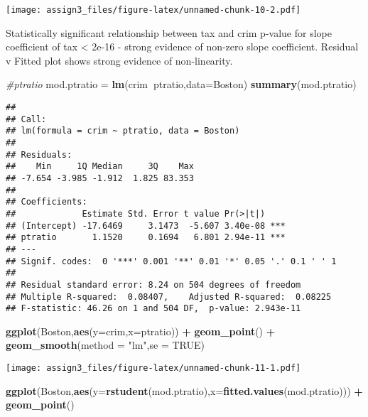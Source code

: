 \documentclass[]{article}
\newenvironment{Shaded}{\begin{snugshade}}{\end{snugshade}}
\newcommand{\CommentTok}[1]{\textcolor[rgb]{0.56,0.35,0.01}{\textit{#1}}}
\newcommand{\DataTypeTok}[1]{\textcolor[rgb]{0.13,0.29,0.53}{#1}}
\newcommand{\KeywordTok}[1]{\textcolor[rgb]{0.13,0.29,0.53}{\textbf{#1}}}
\newcommand{\NormalTok}[1]{#1}
\newcommand{\OperatorTok}[1]{\textcolor[rgb]{0.81,0.36,0.00}{\textbf{#1}}}
\newcommand{\OtherTok}[1]{\textcolor[rgb]{0.56,0.35,0.01}{#1}}
\newcommand{\StringTok}[1]{\textcolor[rgb]{0.31,0.60,0.02}{#1}}
\begin{document}
\texttt{[image: assign3\_files/figure-latex/unnamed-chunk-10-2.pdf]}

Statistically significant relationship between tax and crim p-value for
slope coefficient of tax \textless{} 2e-16 - strong evidence of non-zero
slope coefficient. Residual v Fitted plot shows strong evidence of
non-linearity.

\begin{Shaded}
\begin{Highlighting}[]
\CommentTok{#ptratio}
\NormalTok{mod.ptratio =}\StringTok{ }\KeywordTok{lm}\NormalTok{(crim}\OperatorTok{~}\NormalTok{ptratio,}\DataTypeTok{data=}\NormalTok{Boston)}
\KeywordTok{summary}\NormalTok{(mod.ptratio)}
\end{Highlighting}
\end{Shaded}

\begin{verbatim}
## 
## Call:
## lm(formula = crim ~ ptratio, data = Boston)
## 
## Residuals:
##    Min     1Q Median     3Q    Max 
## -7.654 -3.985 -1.912  1.825 83.353 
## 
## Coefficients:
##             Estimate Std. Error t value Pr(>|t|)    
## (Intercept) -17.6469     3.1473  -5.607 3.40e-08 ***
## ptratio       1.1520     0.1694   6.801 2.94e-11 ***
## ---
## Signif. codes:  0 '***' 0.001 '**' 0.01 '*' 0.05 '.' 0.1 ' ' 1
## 
## Residual standard error: 8.24 on 504 degrees of freedom
## Multiple R-squared:  0.08407,    Adjusted R-squared:  0.08225 
## F-statistic: 46.26 on 1 and 504 DF,  p-value: 2.943e-11
\end{verbatim}

\begin{Shaded}
\begin{Highlighting}[]
\KeywordTok{ggplot}\NormalTok{(Boston,}\KeywordTok{aes}\NormalTok{(}\DataTypeTok{y=}\NormalTok{crim,}\DataTypeTok{x=}\NormalTok{ptratio)) }\OperatorTok{+}\StringTok{ }\KeywordTok{geom_point}\NormalTok{() }\OperatorTok{+}\StringTok{ }\KeywordTok{geom_smooth}\NormalTok{(}\DataTypeTok{method =} \StringTok{"lm"}\NormalTok{,}\DataTypeTok{se =} \OtherTok{TRUE}\NormalTok{)}
\end{Highlighting}
\end{Shaded}

\texttt{[image: assign3\_files/figure-latex/unnamed-chunk-11-1.pdf]}

\begin{Shaded}
\begin{Highlighting}[]
\KeywordTok{ggplot}\NormalTok{(Boston,}\KeywordTok{aes}\NormalTok{(}\DataTypeTok{y=}\KeywordTok{rstudent}\NormalTok{(mod.ptratio),}\DataTypeTok{x=}\KeywordTok{fitted.values}\NormalTok{(mod.ptratio))) }\OperatorTok{+}\StringTok{ }\KeywordTok{geom_point}\NormalTok{() }
\end{Highlighting}
\end{Shaded}
\end{document}
